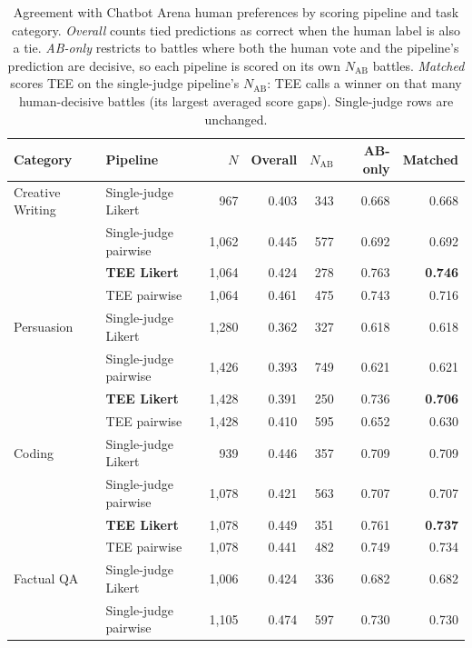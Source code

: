 \begin{table}[ht]
\centering
\small
\caption{Agreement with Chatbot Arena human preferences by scoring pipeline and task category. \emph{Overall} counts tied predictions as correct when the human label is also a tie. \emph{AB-only} restricts to battles where both the human vote and the pipeline's prediction are decisive, so each pipeline is scored on its own $N_\text{AB}$ battles. \emph{Matched} scores TEE on the single-judge pipeline's $N_\text{AB}$: TEE calls a winner on that many human-decisive battles (its largest averaged score gaps). Single-judge rows are unchanged.}
\label{tab:arena_agreement}
\begin{tabular}{llrrrrr}
\toprule
Category & Pipeline & $N$ & Overall & $N_\text{AB}$ & AB-only & Matched \\
\midrule
Creative Writing & Single-judge Likert    &    967 & 0.403 &   343 & 0.668 & 0.668 \\
                 & Single-judge pairwise  & 1,062 & 0.445 &   577 & 0.692 & 0.692 \\
                 & \textbf{TEE Likert}    & 1,064 & 0.424 &   278 & 0.763 & \textbf{0.746} \\
                 & TEE pairwise           & 1,064 & 0.461 &   475 & 0.743 & 0.716 \\
\midrule
Persuasion       & Single-judge Likert    & 1,280 & 0.362 &   327 & 0.618 & 0.618 \\
                 & Single-judge pairwise  & 1,426 & 0.393 &   749 & 0.621 & 0.621 \\
                 & \textbf{TEE Likert}    & 1,428 & 0.391 &   250 & 0.736 & \textbf{0.706} \\
                 & TEE pairwise           & 1,428 & 0.410 &   595 & 0.652 & 0.630 \\
\midrule
Coding           & Single-judge Likert    &    939 & 0.446 &   357 & 0.709 & 0.709 \\
                 & Single-judge pairwise  & 1,078 & 0.421 &   563 & 0.707 & 0.707 \\
                 & \textbf{TEE Likert}    & 1,078 & 0.449 &   351 & 0.761 & \textbf{0.737} \\
                 & TEE pairwise           & 1,078 & 0.441 &   482 & 0.749 & 0.734 \\
\midrule
Factual QA       & Single-judge Likert    & 1,006 & 0.424 &   336 & 0.682 & 0.682 \\
                 & Single-judge pairwise  & 1,105 & 0.474 &   597 & 0.730 & 0.730 \\

\end{tabular}
\end{table}
